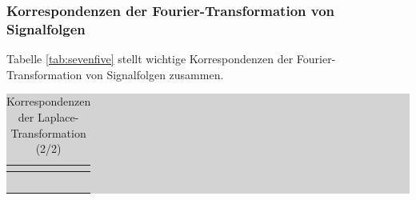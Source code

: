 \clearpage

\subsubsection{Korrespondenzen der Fourier-Transformation von Signalfolgen}

\noindent Tabelle \ref{tab:sevenfive} stellt wichtige Korrespondenzen der Fourier-Transformation von Signalfolgen zusammen.

\begin{table}[H]
\setlength{\arrayrulewidth}{.1em}
\caption{Korrespondenzen der Laplace-Transformation (2/2)}
\setlength{\fboxsep}{0pt}%
\colorbox{lightgray}{%
%
\begin{tabular}{| c | c | c |}
\hline
\parbox[c][0.3in][c]{0.3in}{\smallskip\centering\textbf{\selectfont{Nr}}} &
\parbox[c][0.3in][c]{2.7in}{\smallskip\centering\textbf{\selectfont{Folge x[k]}}} & 
\parbox[c][0.3in][c]{3.3in}{\smallskip\centering\textbf{\selectfont{Fourier-Transformierte X($\Omega$)}}}\\ \hline

\parbox[c][0.5in][c]{0.3in}{} &
\parbox[c][0.5in][c]{2.7in}{\centering{$\delta \left[k\right]$}} & 
\parbox[c][0.5in][c]{3.3in}{}\\ \hline

\parbox[c][0.5in][c]{0.3in}{} &
\parbox[c][0.5in][c]{2.7in}{} & 
\parbox[c][0.5in][c]{3.3in}{\centering{$2\cdot \pi \cdot \sum _{\nu =-\infty }^{\infty }\delta \left(\Omega +2\cdot \pi \cdot \nu \right)$}}\\ \hline

\parbox[c][0.5in][c]{0.3in}{} &
\parbox[c][0.5in][c]{2.7in}{\centering{$\delta \left[k-k_{0} \right]$}} & 
\parbox[c][0.5in][c]{3.3in}{}\\ \hline

\parbox[c][0.5in][c]{0.3in}{} &
\parbox[c][0.5in][c]{2.7in}{} & 
\parbox[c][0.5in][c]{3.3in}{}\\ \hline

\parbox[c][0.5in][c]{0.3in}{} &
\parbox[c][0.5in][c]{2.7in}{} & 
\parbox[c][0.5in][c]{3.3in}{}\\ \hline


\end{tabular}}
\end{table}
